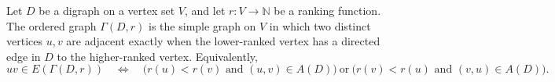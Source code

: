 \begin{definition}
Let \(D\) be a digraph on a vertex set \(V\), and let \(r:V\to\mathbb N\) be a ranking function. The ordered graph \(\Gamma(D,r)\) is the simple graph on \(V\) in which two distinct vertices \(u,v\) are adjacent exactly when the lower-ranked vertex has a directed edge in \(D\) to the higher-ranked vertex. Equivalently,
\[
  uv\in E(\Gamma(D,r))
  \quad\Longleftrightarrow\quad
  \bigl(r(u)<r(v)\text{ and }(u,v)\in A(D)\bigr)
  \ \text{or}\
  \bigl(r(v)<r(u)\text{ and }(v,u)\in A(D)\bigr).
\]
\end{definition}
